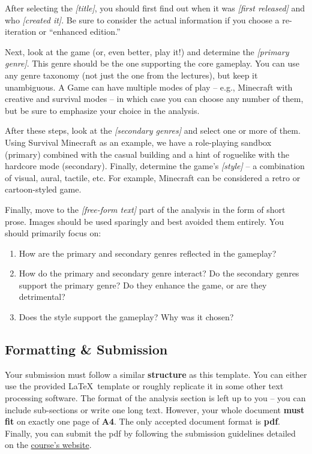 \documentclass[a4paper,10pt,english]{article}
\newcommand{\ph}[1]{\textit{[#1]}}
\begin{document}
After selecting the \ph{title}, you should first find out when it was \ph{first released} and who \ph{created it}. Be sure to consider the actual information if you choose a re-iteration or ``enhanced edition.'' 

Next, look at the game (or, even better, play it!) and determine the \ph{primary genre}. This genre should be the one supporting the core gameplay. You can use any genre taxonomy (not just the one from the lectures), but keep it unambiguous. A Game can have multiple modes of play -- e.g., Minecraft with creative and survival modes -- in which case you can choose any number of them, but be sure to emphasize your choice in the analysis.

After these steps, look at the \ph{secondary genres} and select one or more of them. Using Survival Minecraft as an example, we have a role-playing sandbox (primary) combined with the casual building and a hint of roguelike with the hardcore mode (secondary). Finally, determine the game's \ph{style} -- a combination of visual, aural, tactile, etc. For example, Minecraft can be considered a retro or cartoon-styled game.

Finally, move to the \ph{free-form text} part of the analysis in the form of short prose. Images should be used sparingly and best avoided them entirely. You should primarily focus on: 
\begin{enumerate}
    \item How are the primary and secondary genres reflected in the gameplay?
    \item How do the primary and secondary genre interact? Do the secondary genres support the primary genre? Do they enhance the game, or are they detrimental?
    \item Does the style support the gameplay? Why was it chosen?
\end{enumerate}

\subsection*{Formatting \& Submission}

Your submission must follow a similar \textbf{structure} as this template. You can either use the provided \LaTeX\ template or roughly replicate it in some other text processing software. The format of the analysis section is left up to you -- you can include sub-sections or write one long text. However, your whole document \textbf{must fit} on exactly one page of \textbf{A4}. The only accepted document format is \textbf{pdf}. Finally, you can submit the pdf by following the submission guidelines detailed on the \href{http://cphoto.fit.vutbr.cz/ludo/courses/izhv/exercises/sub/}{course's website}.
\end{document}
